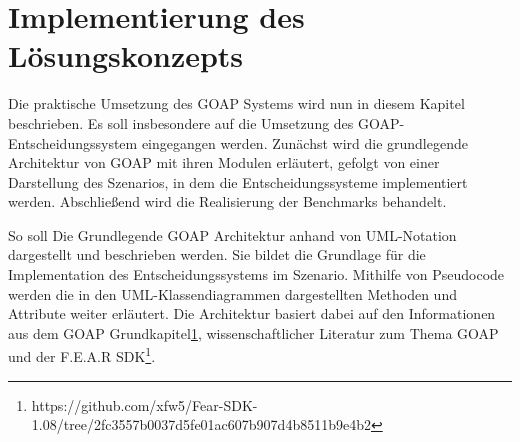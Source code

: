 \usepackage{svg}






\lstset{style=mystyle}


\chapter{Implementierung des Lösungskonzepts}

Die praktische Umsetzung des GOAP Systems wird nun in diesem Kapitel beschrieben. Es soll insbesondere auf die Umsetzung des GOAP-Entscheidungssystem eingegangen werden. Zunächst wird die grundlegende Architektur von GOAP mit ihren Modulen erläutert, gefolgt von einer Darstellung des Szenarios, in dem die Entscheidungssysteme implementiert werden. Abschließend wird die Realisierung der Benchmarks behandelt.

So soll Die Grundlegende GOAP Architektur anhand von UML-Notation dargestellt und beschrieben werden. Sie bildet die Grundlage für die Implementation des Entscheidungssystems im Szenario. Mithilfe von Pseudocode werden die in den UML-Klassendiagrammen dargestellten Methoden und Attribute weiter erläutert. Die Architektur basiert dabei auf den Informationen aus dem GOAP Grundkapitel\ref{}, wissenschaftlicher Literatur zum Thema GOAP und der F.E.A.R SDK\footnote{https://github.com/xfw5/Fear-SDK-1.08/tree/2fc3557b0037d5fe01ac607b907d4b8511b9e4b2}.

